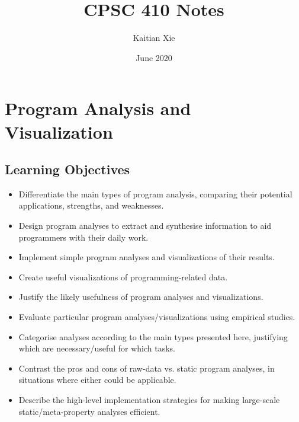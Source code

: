\documentclass{article}
\title{CPSC 410 Notes}
\author{Kaitian Xie}
\date{June 2020}
\begin{document}
\maketitle
\pagebreak

\tableofcontents
\pagebreak

\section{Program Analysis and Visualization}

\subsection{Learning Objectives}

\begin{itemize}
    \item Differentiate the main types of program analysis, comparing their potential applications, strengths, and weaknesses.
    \item Design program analyses to extract and synthesise information to aid programmers with their daily work.
    \item Implement simple program analyses and visualizations of their results.
    \item Create useful visualizations of programming-related data.
    \item Justify the likely usefulness of program analyses and visualizations.
    \item Evaluate particular program analyses/visualizations using empirical studies.
    \item Categorise analyses according to the main types presented here, justifying which are necessary/useful for which tasks.
    \item Contrast the pros and cons of raw-data vs. static program analyses, in situations where either could be applicable.
    \item Describe the high-level implementation strategies for making large-scale static/meta-property analyses efficient.
\end{itemize}
\end{document}
